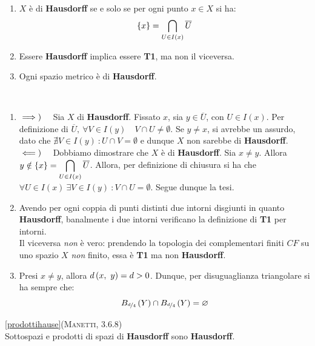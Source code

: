 \begin{observe}~{}
	\begin{enumerate}
		\item $X$ è di \textbf{Hausdorff} se e solo se per ogni punto $x\in X$ si ha:
		\begin{equation}
			\left\{x\right\}=\inter_{U\in I\left(x\right)}\overline{U}
		\end{equation}
	\item Essere \textbf{Hausdorff} implica essere \textbf{T1}, ma non il viceversa.
		\item Ogni spazio metrico è di \textbf{Hausdorff}.
	\end{enumerate}
\end{observe}
\begin{demonstration}~{}
\begin{enumerate}[label=\Roman*]
\item $\impliesdx$ Sia $X$ di \textbf{Hausdorff}. Fissato $x$, sia $y\in\overline{U}$, con $U\in I\left(x\right)$. Per definizione di $\overline{U},\ \forall V\in I\left(y\right)\quad V\cap U\neq\emptyset$. Se $y \neq x$, si avrebbe un assurdo, dato che $\nexists V\in I\left(y\right)\ \colon U\cap V=\emptyset$ e dunque $X$ non sarebbe di \textbf{Hausdorff}.\\
$\impliessx$ Dobbiamo dimostrare che $X$ è di \textbf{Hausdorff}. Sia $x\neq y$. Allora $\displaystyle y\notin\left\{x\right\}=\inter_{U\in I\left(x\right)}\overline{U}$. Allora, per definizione di chiusura si ha che $\forall U\in I\left(x\right)\ \exists V\in I\left(y\right)\ \colon V\cap U=\emptyset$. Segue dunque la tesi.
\item Avendo per ogni coppia di punti distinti due intorni disgiunti in quanto \textbf{Hausdorff}, banalmente i due intorni verificano la definizione di \textbf{T1} per intorni.\\
Il viceversa \textit{non} è vero: prendendo la topologia dei complementari finiti $CF$ su uno spazio $X$ \textit{non} finito, essa è \textbf{T1} ma non \textbf{Hausdorff}.
\item Presi $x\neq y$, allora $\mvf{d}{x}{y}=d>0$. Dunque, per disuguaglianza triangolare si ha sempre che:
\begin{equation*}
B_{\nicefrac{d}{4}}\left(Y\right)\cap B_{\nicefrac{d}{4}}\left(Y\right)=\emptyset
\end{equation*}
\end{enumerate}
\end{demonstration}
\begin{proposition}\ref{prodottihause}\textsc{(Manetti, 3.6.8)}\\
Sottospazi e prodotti di spazi di \textbf{Hausdorff} sono \textbf{Hausdorff}.
\end{proposition}

